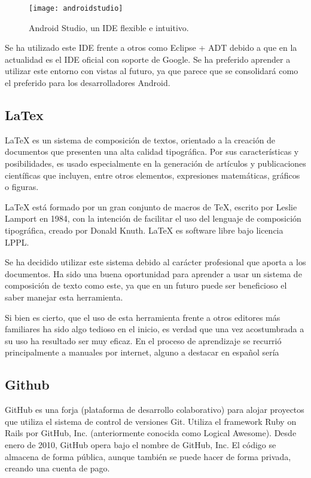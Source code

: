 \begin{figure}[h]
	\centering
	\texttt{[image: androidstudio]}
	\caption{Android Studio, un IDE flexible e intuitivo.}
	\label{fig:androidstudio}
\end{figure}

Se ha utilizado este IDE frente a otros como Eclipse + ADT \cite{URL::eclipseADT} debido a que en la actualidad es el IDE oficial con soporte de Google. Se ha preferido aprender a utilizar este entorno con vistas al futuro, ya que parece que se consolidará como el preferido para los desarrolladores Android.

\subsection{LaTex}

LaTeX es un sistema de composición de textos, orientado a la creación de documentos que presenten una alta calidad tipográfica. Por sus características y posibilidades, es usado especialmente en la generación de artículos y publicaciones científicas que incluyen, entre otros elementos, expresiones matemáticas, gráficos o figuras.


LaTeX está formado por un gran conjunto de macros de TeX, escrito por Leslie Lamport en 1984, con la intención de facilitar el uso del lenguaje de composición tipográfica, creado por Donald Knuth. LaTeX es software libre bajo licencia LPPL.


Se ha decidido utilizar este sistema debido al carácter profesional que aporta a los documentos. Ha sido una buena oportunidad para aprender a usar un sistema de composición de texto como este, ya que en un futuro puede ser beneficioso el saber manejar esta herramienta. 


Si bien es cierto, que el uso de esta herramienta frente a otros editores más familiares ha sido algo tedioso en el inicio, es verdad que una vez acostumbrada a su uso ha resultado ser muy eficaz. En el proceso de aprendizaje se recurrió principalmente a manuales por internet, alguno a destacar en español sería \cite{URL::manualLatex}

\subsection{Github}

GitHub\cite{URL::Github} es una forja (plataforma de desarrollo colaborativo) para alojar proyectos que utiliza el sistema de control de versiones Git. Utiliza el framework Ruby on Rails por GitHub, Inc. (anteriormente conocida como Logical Awesome). Desde enero de 2010, GitHub opera bajo el nombre de GitHub, Inc. El código se almacena de forma pública, aunque también se puede hacer de forma privada, creando una cuenta de pago.


